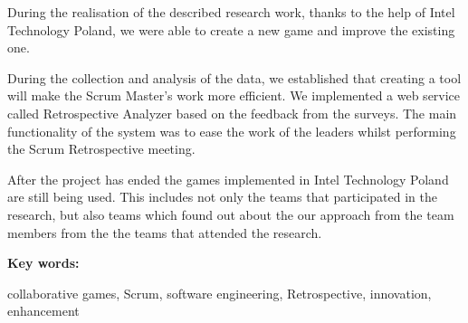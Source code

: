\tab During the realisation of the described research work, thanks to the help of Intel Technology Poland, we were able to create a new game and improve the existing one.

\tab During the collection and analysis of the data, we established that creating a tool will make the Scrum Master's work more efficient. We implemented a web service called Retrospective Analyzer based on the feedback from the surveys. The main functionality of the system was to ease the work of the leaders whilst performing the Scrum Retrospective meeting.

\tab After the project has ended the games implemented in Intel Technology Poland are still being used. This includes not only the teams that participated in the research, but also teams which found out about the our  approach from the team members from the the teams that attended the research. 

\vspace{12pt}
\noindent\textbf{Key words:}

\vspace{6pt}
\noindent collaborative games, Scrum, software engineering, Retrospective, innovation, enhancement